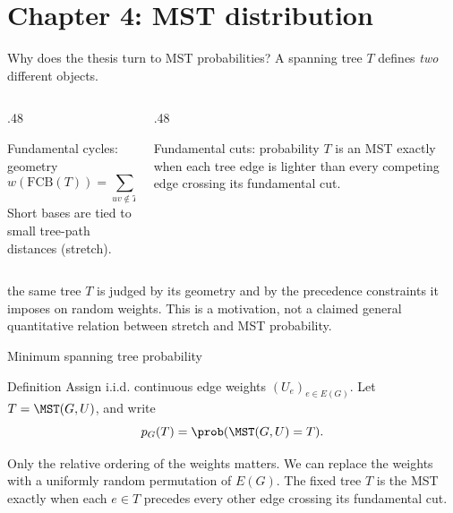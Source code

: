 \section{Chapter 4: MST distribution}


\begin{frame}{Why does the thesis turn to MST probabilities?}
 A spanning tree $T$ defines \emph{two} different objects.
 \begin{columns}[T,onlytextwidth]
  \begin{column}{.48\textwidth}
   \begin{block}{Fundamental cycles: geometry}
   \[w(\mathrm{FCB}(T))=\sum_{uv\notin T}\bigl(1+d_T(u,v)\bigr).\]
   Short bases are tied to small tree-path distances (stretch).
   \end{block}
  \end{column}
  \begin{column}{.48\textwidth}
   \begin{block}{Fundamental cuts: probability}
   $T$ is an MST exactly when each tree edge is lighter than every competing edge crossing its fundamental cut.
   \end{block}
  \end{column}
 \end{columns}
 \vspace{.3cm}
  the same tree $T$ is judged by its geometry and by the precedence constraints it imposes on random weights.
 \small\textcolor{thesisGray}{This is a motivation, not a claimed general quantitative relation between stretch and MST probability.}
\end{frame}


\begin{frame}{Minimum spanning tree probability}
 \begin{block}{Definition}
 Assign i.i.d. continuous edge weights \((U_e)_{e\in E(G)}\). Let \(T=\MST(G,U)\), and write
 \[ p_G(T)=\prob(\MST(G,U)=T). \]
 \end{block}
  Only the relative ordering of the weights matters. We can replace the weights with a uniformly random permutation of \(E(G)\).
  The fixed tree \(T\) is the MST exactly when each \(e\in T\) precedes every other edge crossing its fundamental cut.
\end{frame}


